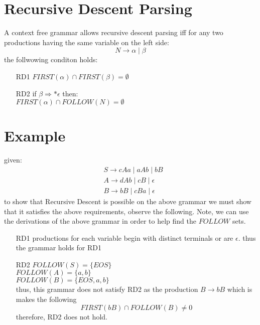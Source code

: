\documentclass[12pt]{book}
\title{\coursetitle\linebreak\lecturename}
\author{\\Cain Susko\\ 
           \\ \\ \\
      Queen's University 
    \\School of Computing\\}
\begin{document}
\begin{titlepage}
        \maketitle
\end{titlepage}


\section*{Recursive Descent Parsing}
A context free grammar allows recursive descent parsing iff for any two productions having the
same variable on the left side:
\[N \to \alpha \mid \beta\]
the follwowing conditon holds:
\begin{itemize}
        \item[RD1] $FIRST(\alpha)\cap FIRST(\beta)=\emptyset$
        \item[RD2] if $\beta \Rightarrow\text{*} \epsilon$ then:\\
                $FIRST(\alpha)\cap FOLLOW(N) = \emptyset$
\end{itemize}

\section*{Example}
given:
\begin{align*}
        & S\to cAa \mid aAb \mid bB\\
        & A \to dAb \mid cB \mid \epsilon\\
        & B \to bB \mid cBa \mid \epsilon
\end{align*}
to show that Recursive Descent is possible on
the above grammar we must show that it satisfies 
the above requirements, observe the following. Note, we can use the derivations of the above
grammar in order to help find the $FOLLOW$ sets.
\begin{itemize}
        \item[RD1] productions for each variable begin with 
                distinct terminals or are $\epsilon$. thus the grammar holds for RD1
        \item[RD2] $FOLLOW(S) = \{EOS\}$\\
                $FOLLOW(A) = \{a,b\}$\\
                $FOLLOW(B) = \{EOS, a, b\}$\\
                thus, this grammar does not satisfy RD2 as the production $B\to bB$ which is
                makes the following
                \[FIRST(bB)\cap FOLLOW(B)\neq 0\]
                therefore, RD2 does not hold.


        
\end{itemize}
\end{document}
